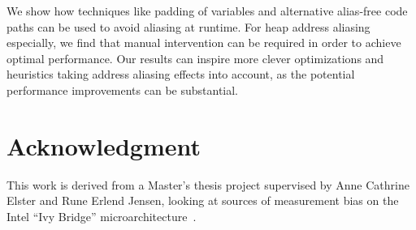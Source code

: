 \documentclass[10pt, conference, compsocconf]{IEEEtran}
\begin{document}
We show how techniques like padding of variables and alternative alias-free code paths can be used to avoid aliasing at runtime.
For heap address aliasing especially, we find that manual intervention can be required in order to achieve optimal performance.
Our results can inspire more clever optimizations and heuristics taking address aliasing effects into account, as the potential performance improvements can be substantial.


\section*{Acknowledgment}
This work is derived from a Master's thesis project supervised by Anne Cathrine Elster and Rune Erlend Jensen, looking at sources of measurement bias on the Intel ``Ivy Bridge'' microarchitecture~\cite{MasterThesis}.




\end{document}

